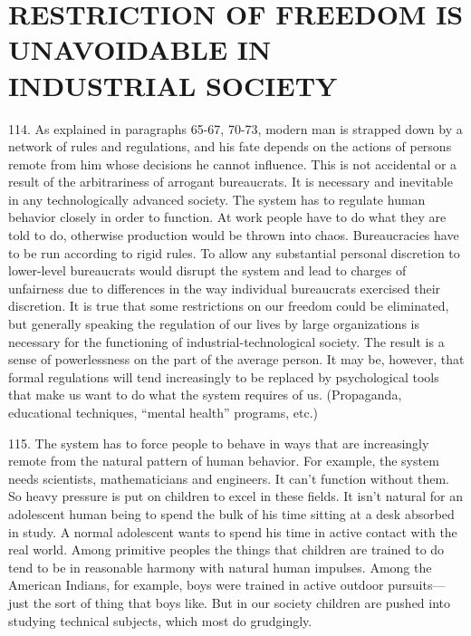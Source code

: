 \documentclass{article}
\begin{document}
\section{RESTRICTION OF FREEDOM IS UNAVOIDABLE IN INDUSTRIAL SOCIETY}

\hspace{0.5cm} 114. As explained in paragraphs 65-67, 70-73, modern man is strapped down by a network of 
rules and regulations, and his fate depends on the actions of persons remote from him whose 
decisions he cannot influence. This is not accidental or a result of the arbitrariness of arrogant 
bureaucrats. It is necessary and inevitable in any technologically advanced society. The system 
has to regulate human behavior closely in order to function. At work people have to do what they 
are told to do, otherwise production would be thrown into chaos. Bureaucracies have to be run 
according to rigid rules. To allow any substantial personal discretion to lower-level bureaucrats 
would disrupt the system and lead to charges of unfairness due to differences in the way individual 
bureaucrats exercised their discretion. It is true that some restrictions on our freedom could be 
eliminated, but generally speaking the regulation of our lives by large organizations is necessary 
for the functioning of industrial-technological society. The result is a sense of powerlessness on 
the part of the average person. It may be, however, that formal regulations will tend increasingly 
to be replaced by psychological tools that make us want to do what the system requires of 
us. (Propaganda, educational techniques, “mental health” programs, etc.) \vspace{\baselineskip}

115. The system has to force people to behave in ways that are increasingly remote from the 
natural pattern of human behavior. For example, the system needs scientists, mathematicians and 
engineers. It can’t function without them. So heavy pressure is put on children to excel in these 
fields. It isn’t natural for an adolescent human being to spend the bulk of his time sitting at a desk 
absorbed in study. A normal adolescent wants to spend his time in active contact with the real 
world. Among primitive peoples the things that children are trained to do tend to be in reasonable 
harmony with natural human impulses. Among the American Indians, for example, boys were 
trained in active outdoor pursuits—just the sort of thing that boys like. But in our society children 
are pushed into studying technical subjects, which most do grudgingly. \vspace{\baselineskip}
\end{document}
